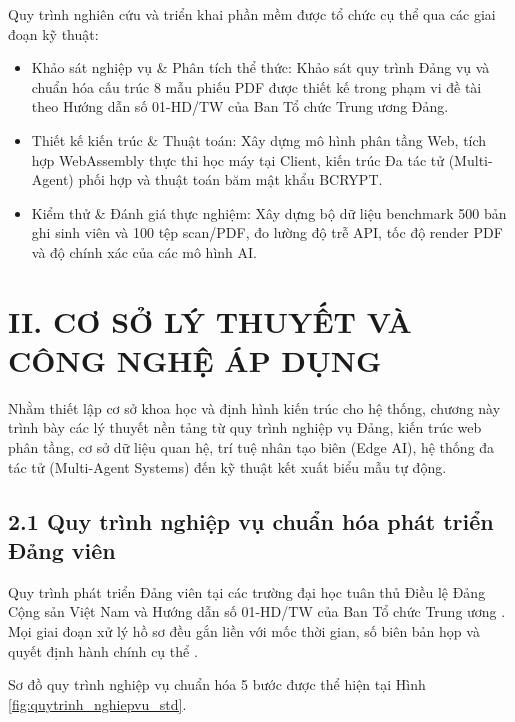 \documentclass[12pt,a4paper]{report}
\begin{document}
Quy trình nghiên cứu và triển khai phần mềm được tổ chức cụ thể qua các giai đoạn kỹ thuật:
\begin{itemize}[label=--,leftmargin=*]
  \item Khảo sát nghiệp vụ \& Phân tích thể thức: Khảo sát quy trình Đảng vụ và chuẩn hóa cấu trúc 8 mẫu phiếu PDF được thiết kế trong phạm vi đề tài theo Hướng dẫn số 01-HD/TW của Ban Tổ chức Trung ương Đảng.
  \item Thiết kế kiến trúc \& Thuật toán: Xây dựng mô hình phân tầng Web, tích hợp WebAssembly thực thi học máy tại Client, kiến trúc Đa tác tử (Multi-Agent) phối hợp \cite{gill2024edgeai, wang2024survey} và thuật toán băm mật khẩu BCRYPT.
  \item Kiểm thử \& Đánh giá thực nghiệm: Xây dựng bộ dữ liệu benchmark 500 bản ghi sinh viên và 100 tệp scan/PDF, đo lường độ trễ API, tốc độ render PDF và độ chính xác của các mô hình AI.
\end{itemize}

\section*{II. CƠ SỞ LÝ THUYẾT VÀ CÔNG NGHỆ ÁP DỤNG}

Nhằm thiết lập cơ sở khoa học và định hình kiến trúc cho hệ thống, chương này trình bày các lý thuyết nền tảng từ quy trình nghiệp vụ Đảng, kiến trúc web phân tầng, cơ sở dữ liệu quan hệ, trí tuệ nhân tạo biên (Edge AI), hệ thống đa tác tử (Multi-Agent Systems) đến kỹ thuật kết xuất biểu mẫu tự động.

\subsection*{2.1 Quy trình nghiệp vụ chuẩn hóa phát triển Đảng viên}
Quy trình phát triển Đảng viên tại các trường đại học tuân thủ Điều lệ Đảng Cộng sản Việt Nam và Hướng dẫn số 01-HD/TW của Ban Tổ chức Trung ương \cite{nofrianda2022jictas}. Mọi giai đoạn xử lý hồ sơ đều gắn liền với mốc thời gian, số biên bản họp và quyết định hành chính cụ thể \cite{sinlae2024jsmd}.

Sơ đồ quy trình nghiệp vụ chuẩn hóa 5 bước được thể hiện tại Hình \ref{fig:quytrinh_nghiepvu_std}.
\end{document}
